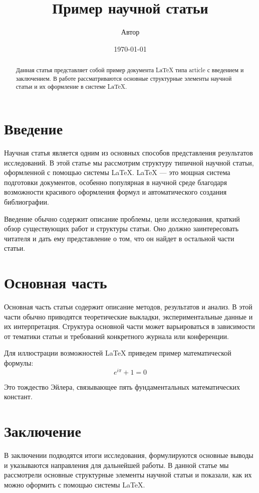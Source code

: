 \documentclass{article}
\title{Пример научной статьи}
\author{Автор}
\date{\today}
\begin{document}
\maketitle

\begin{abstract}
Данная статья представляет собой пример документа \LaTeX{} типа article с введением и заключением. В работе рассматриваются основные структурные элементы научной статьи и их оформление в системе \LaTeX{}.
\end{abstract}

\section{Введение}
Научная статья является одним из основных способов представления результатов исследований. В этой статье мы рассмотрим структуру типичной научной статьи, оформленной с помощью системы \LaTeX{}. \LaTeX{} — это мощная система подготовки документов, особенно популярная в научной среде благодаря возможности красивого оформления формул и автоматического создания библиографии.

Введение обычно содержит описание проблемы, цели исследования, краткий обзор существующих работ и структуры статьи. Оно должно заинтересовать читателя и дать ему представление о том, что он найдет в остальной части статьи.

\section{Основная часть}
Основная часть статьи содержит описание методов, результатов и анализ. В этой части обычно приводятся теоретические выкладки, экспериментальные данные и их интерпретация. Структура основной части может варьироваться в зависимости от тематики статьи и требований конкретного журнала или конференции.

Для иллюстрации возможностей \LaTeX{} приведем пример математической формулы:
\begin{equation}
    e^{i\pi} + 1 = 0
\end{equation}

Это тождество Эйлера, связывающее пять фундаментальных математических констант.

\section{Заключение}
В заключении подводятся итоги исследования, формулируются основные выводы и указываются направления для дальнейшей работы. В данной статье мы рассмотрели основные структурные элементы научной статьи и показали, как их можно оформить с помощью системы \LaTeX{}.
\end{document}
